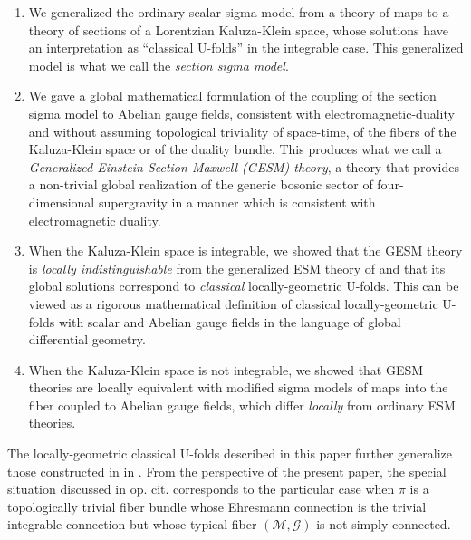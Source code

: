 \documentclass[10pt, cmp, numbook, final, a4paper]{svjour}
\newcommand{\cM}{\mathcal{M}}
\def\cG{\mathcal{G}}
\begin{document}
\begin{enumerate}[1.]
\item We generalized the ordinary scalar sigma model from a theory of
  maps to a theory of sections of a Lorentzian Kaluza-Klein space,
  whose solutions have an interpretation as ``classical U-folds'' in
  the integrable case. This generalized model is what we call the {\em
    section sigma model}.
\item We gave a global mathematical formulation of the
  coupling of the section sigma model to Abelian gauge fields,
  consistent with electromagnetic-duality and without assuming
  topological triviality of space-time, of the fibers of the
  Kaluza-Klein space or of the duality bundle. This produces what we
  call a {\em Generalized Einstein-Section-Maxwell (GESM) theory}, a
  theory that provides a non-trivial global realization of the generic
  bosonic sector of four-dimensional supergravity in a manner which is
  consistent with electromagnetic duality.
\item When the Kaluza-Klein space is integrable, we showed that the
  GESM theory is {\em locally indistinguishable} from the generalized
  ESM theory of \cite{GESM} and that its global solutions correspond
  to {\em classical} locally-geometric U-folds. This can be viewed as
  a rigorous mathematical definition of classical locally-geometric
  U-folds with scalar and Abelian gauge fields in the language of
  global differential geometry.
\item When the Kaluza-Klein space is not integrable, we showed that
  GESM theories are locally equivalent with modified sigma models
  of maps into the fiber coupled to Abelian gauge fields, which
  differ {\em locally} from ordinary ESM theories.
\end{enumerate}
		
\noindent The locally-geometric classical U-folds described
in this paper further generalize those constructed in in
\cite{GESM}. From the perspective of the present paper, the special
situation discussed in op. cit. corresponds to the particular case
when $\pi$ is a topologically trivial fiber bundle whose Ehresmann
connection is the trivial integrable connection but whose typical
fiber $(\cM,\cG)$ is not simply-connected.
\end{document}
